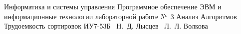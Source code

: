 \documentclass{bmstu}
\begin{document}
\makereporttitle
{Информатика и системы управления} %
{Программное обеспечение ЭВМ и информационные технологии}
{лабораторной работе №~3} %
{Анализ Алгоритмов} %
{Трудоемкость сортировок} %
{} %
{ИУ7-53Б} %
{~Н.~Д. Лысцев} %
{~Л.~Л. Волкова}

\maketableofcontents








\makebibliography
\end{document}
